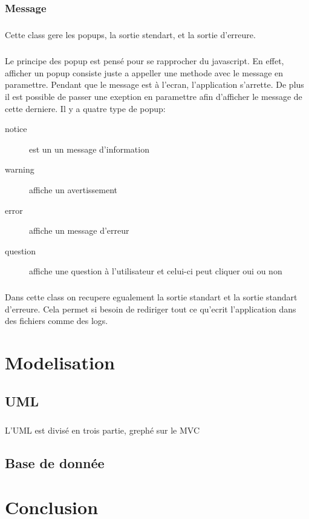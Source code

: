 \documentclass[a4paper,10pt]{report}
\begin{document}
		\subsection{Message}

			\paragraph*{}
			Cette class gere les popups, la sortie stendart, et la sortie d'erreure.

			\paragraph*{}
			Le principe des popup est pensé pour se rapprocher du javascript. En effet, afficher un popup consiste juste a appeller une methode avec le message en paramettre. Pendant que le message est à l'ecran, l'application s'arrette. De plus il est possible de passer une exeption en paramettre afin d'afficher le message de cette derniere.
			Il y a quatre type de popup:
			\begin{description}
				\item[notice] est un un message d'information
				\item[warning] affiche un avertissement
				\item[error] affiche un message d'erreur
				\item[question] affiche une question à l'utilisateur et celui-ci peut cliquer oui ou non 
			\end{description}

			\paragraph*{}
			Dans cette class on recupere egualement la sortie standart  et la sortie standart d'erreure. Cela permet si besoin de rediriger tout ce qu'ecrit l'application dans des fichiers comme des logs.

\chapter{Modelisation}

	\section{UML}

		\paragraph*{}
		L'UML est divisé en trois partie, grephé sur le MVC

	\section{Base de donnée}

\chapter*{Conclusion}
\end{document}
